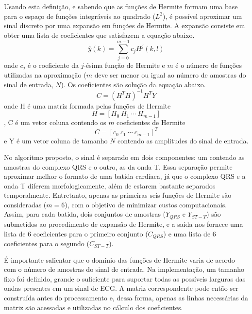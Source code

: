 Usando esta definição, e sabendo que as funções de Hermite formam uma base para o espaço de funções integráveis ao quadrado ($L^2$), é possível aproximar um sinal discreto por uma expansão em funções de Hermite. A expansão consiste em obter uma lista de coeficientes que satisfazem a equação abaixo.
\begin{equation} \label{equ:hermite_expansion}
   \hat{y}(k) = \sum_{j=0}^{m-1} c_jH^j(k,l)
\end{equation}
onde $c_j$ é o coeficiente da $j$-ésima função de Hermite e $m$ é o número de funções utilizadas na aproximação ($m$ deve ser menor ou igual ao número de amostras do sinal de entrada, $N$). Os coeficientes são solução da equação abaixo.
\begin{equation} \label{equ:solve}
    C = (H^TH)^{-1}H^TY
\end{equation}
onde H é uma matriz formada pelas funções de Hermite
\begin{equation}
    H = [H_0\ H_1\ \cdots\ H_{m-1}]
\end{equation},
C é um vetor coluna contendo os $m$ coeficientes de Hermite
\begin{equation}
    C = [c_0\ c_1\ \cdots\ c_{m-1}]^T
\end{equation}
e Y é um vetor coluna de tamanho $N$ contendo as amplitudes do sinal de entrada.

No algoritmo proposto, o sinal é separado em dois componentes: um contendo as amostras do complexo QRS e o outro, as da onda T. Essa separação permite aproximar melhor o formato de uma batida cardíaca, já que o complexo QRS e a onda T diferem morfologicamente, além de estarem bastante separados temporalmente. Entretanto, apenas as primeiras seis funções de Hermite são consideradas ($m = 6$), com o objetivo de minimizar custos computacionais. Assim, para cada batida, dois conjuntos de amostras ($Y_{QRS}$ e $Y_{ST-T}$) são submetidos ao procedimento de expansão de Hermite, e a saída nos fornece uma lista de 6 coeficientes para o primeiro conjunto ($C_{QRS}$) e uma lista de 6 coeficientes para o segundo ($C_{ST-T}$).

É importante salientar que o domínio das funções de Hermite varia de acordo com o número de amostras do sinal de entrada. Na implementação, um tamanho fixo foi definido, grande o suficiente para suportar todas as possíveis larguras das ondas presentes em um sinal de ECG. A matriz correspondente pode então ser construída antes do processamento e, dessa forma, apenas as linhas necessárias da matriz são acessadas e utilizadas no cálculo dos coeficientes.

